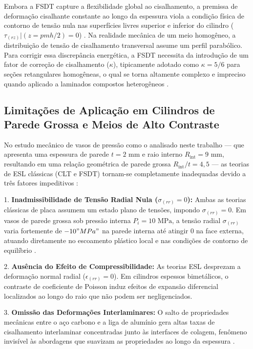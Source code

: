Embora a FSDT capture a flexibilidade global ao cisalhamento, a premissa de deformação cisalhante constante ao longo da espessura viola a condição física de contorno de tensão nula nas superfícies livres superior e inferior do cilindro ($\tau_{(rz)}|(z = p m h/2) = 0$) \cite{RMJones2018}. Na realidade mecânica de um meio homogêneo, a distribuição de tensão de cisalhamento transversal assume um perfil parabólico. Para corrigir essa discrepância energética, a FSDT necessita da introdução de um fator de correção de cisalhamento ($\kappa$), tipicamente adotado como $\kappa = 5/6$ para seções retangulares homogêneas, o qual se torna altamente complexo e impreciso quando aplicado a laminados compostos heterogêneos \cite{RMJones2018}.

\subsection{Limitações de Aplicação em Cilindros de Parede Grossa e Meios de Alto Contraste}

No estudo mecânico de vasos de pressão como o analisado neste trabalho — que apresenta uma espessura de parede $t = 2 \text{ mm}$ e raio interno $R_{\text{int}} = 9 \text{ mm}$, resultando em uma relação geométrica de parede grossa $R_{\text{int}}/t = 4,5$ — as teorias de ESL clássicas (CLT e FSDT) tornam-se completamente inadequadas devido a três fatores impeditivos \cite{Sadd2009}:

1. \textbf{Inadmissibilidade de Tensão Radial Nula ($\sigma_{(rr)} = 0$):} Ambas as teorias clássicas de placa assumem um estado plano de tensões, impondo $\sigma_{(rr)} = 0$. Em vasos de parede grossa sob pressão interna $P_i = 10 \text{ MPa}$, a tensão radial $\sigma_{(rr)}$ varia fortemente de $-10" MPa"$ na parede interna até atingir $0$ na face externa, atuando diretamente no escoamento plástico local e nas condições de contorno de equilíbrio \cite{Sadd2009}.

2. \textbf{Ausência do Efeito de Compressibilidade:} As teorias ESL desprezam a deformação normal radial ($\epsilon_{(rr)} = 0$). Em cilindros espessos bimetálicos, o contraste de coeficiente de Poisson induz efeitos de expansão diferencial localizados ao longo do raio que não podem ser negligenciados.

3. \textbf{Omissão das Deformações Interlaminares:} O salto de propriedades mecânicas entre o aço carbono e a liga de alumínio gera altas taxas de cisalhamento interlaminar concentradas junto às interfaces de colagem, fenômeno invisível às abordagens que suavizam as propriedades ao longo da espessura \cite{PartonReport}.

